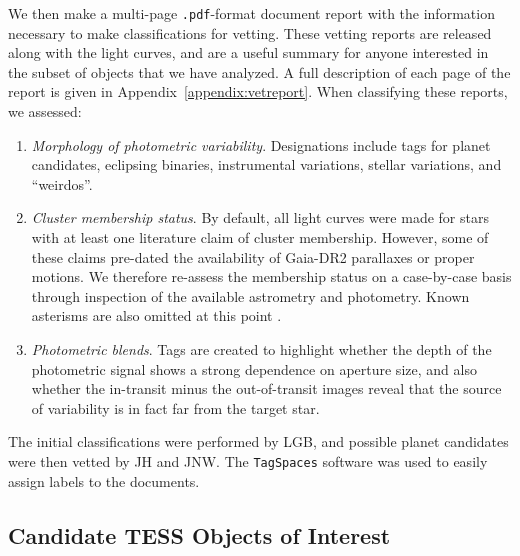 \documentclass[12pt,twocolumn,tighten]{aastex62}
\begin{document}
We then make a multi-page \texttt{.pdf}-format document report with
the information necessary to make classifications for vetting.  These
vetting reports are released along with the light curves, and are a
useful summary for anyone interested in the subset of objects that we
have analyzed.  A full description of each page of the report is given
in Appendix~\ref{appendix:vetreport}.
When classifying these reports, we assessed:
\begin{enumerate}
    \item {\it Morphology of photometric variability}. Designations
      include tags for planet candidates, eclipsing binaries,
      instrumental variations, stellar variations, and ``weirdos''.
    \item {\it Cluster membership status}. By default, all light
      curves were made for stars with at least one literature claim of
      cluster membership.  However, some of these claims pre-dated the
      availability of Gaia-DR2 parallaxes or proper motions.  We
      therefore re-assess the membership status on a case-by-case
      basis through inspection of the available astrometry and
      photometry.  Known asterisms are also omitted at this point
      \citep[{\it
      e.g.},][]{sulentic_revised_1973,baumgardt_asterisms_1998,kos_galah_2018}.
    \item {\it Photometric blends}. Tags are created to highlight
      whether the depth of the photometric signal shows a strong
      dependence on aperture size, and also whether the in-transit
      minus the out-of-transit images reveal that the source of
      variability is in fact far from the target star.
\end{enumerate}
The initial classifications were performed by LGB, and possible
planet candidates were then vetted by JH and JNW.
The \texttt{TagSpaces}
software was used to easily assign labels to the documents.


\subsection{Candidate TESS Objects of Interest}
\label{subsec:ctois}
\end{document}
